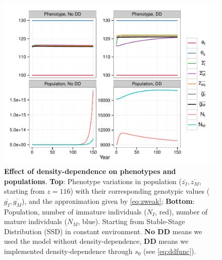 \begin{figure}[ht!]
	\centering
	\includegraphics[scale=1]{Figures/DDphenopop.pdf}
	\caption{\textbf{Effect of density-dependence on phenotypes and populations}. \textbf{Top}: Phenotype variations in population ($\overline{z_I}, \overline{z_M}$, starting from $z = 116$) with their corresponding genotypic values ($\overline{g_I}, \overline{g_M}$), and the approximation given by \autoref{eq:zweak}; \textbf{Bottom}: Population, number of immature individuals ($N_I$, red), number of mature individuals ($N_M$, blue). Starting from Stable-Stage Distribution (SSD) in constant environment. \textbf{No DD} means we used the model without density-dependence, \textbf{DD} means we implemented density-dependence through $s_0$ (see \autoref{eq:ddfunc}).}
	\label{fig:dd}
\end{figure}

